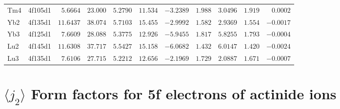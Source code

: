 \begin{table}[H]
{\begin{tabular}{llrrrrrrrrr}
Tm4 & 4f105d1 &$5.6664$ &$23.000$ &$5.2790$ &$11.534$ &$-3.2389$ &$1.988$ &$3.0496$ &$1.919$ &$0.0002$ \\
Yb2 & 4f135d1 &$11.6437$ &$38.074$ &$5.7103$ &$15.455$ &$-2.9992$ &$1.582$ &$2.9369$ &$1.554$ &$-0.0017$ \\
Yb3 & 4f125d1 &$7.6609$ &$28.088$ &$5.3775$ &$12.926$ &$-5.9455$ &$1.817$ &$5.8255$ &$1.793$ &$-0.0004$ \\
Lu2 & 4f145d1 &$11.6308$ &$37.717$ &$5.5427$ &$15.158$ &$-6.0682$ &$1.432$ &$6.0147$ &$1.420$ &$-0.0024$ \\
Lu3 & 4f135d1 &$7.6106$ &$27.715$ &$5.2212$ &$12.656$ &$-2.1969$ &$1.729$ &$2.0887$ &$1.671$ &$-0.0007$ \\
\hline
\end{tabular}
}
\end{table}
\section{{\large $\langle j_2\rangle$} Form factors for 5f electrons  of actinide ions}
